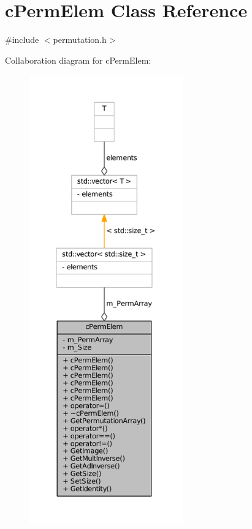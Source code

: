 \hypertarget{classcPermElem}{
\section{c\-Perm\-Elem \-Class \-Reference}
\label{classcPermElem}
}


{\ttfamily \#include $<$permutation.\-h$>$}



\-Collaboration diagram for c\-Perm\-Elem\-:
\nopagebreak
\begin{figure}[H]
\begin{center}
\leavevmode
\includegraphics[height=550pt]{classcPermElem__coll__graph}
\end{center}
\end{figure}
